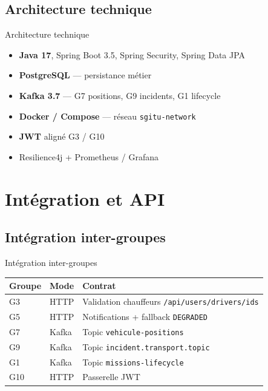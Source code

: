 \documentclass[aspectratio=169,xcolor=table]{beamer}
\begin{document}
\subsection{Architecture technique}

\begin{frame}{Architecture technique}
  \begin{itemize}
    \item \textbf{Java 17}, Spring Boot 3.5, Spring Security, Spring Data JPA
    \item \textbf{PostgreSQL} — persistance métier
    \item \textbf{Kafka 3.7} — G7 positions, G9 incidents, G1 lifecycle
    \item \textbf{Docker / Compose} — réseau \texttt{sgitu-network}
    \item \textbf{JWT} aligné G3 / G10
    \item Resilience4j + Prometheus / Grafana
  \end{itemize}
\end{frame}

\section{Intégration et API}

\subsection{Intégration inter-groupes}

\begin{frame}{Intégration inter-groupes}
  \small
  \begin{table}[]
    \centering
    \renewcommand{\arraystretch}{1.3}
    \setlength{\tabcolsep}{8pt}
    {
      \begin{tabular}{p{1.5cm}p{1.5cm}p{5.2cm}}
        \toprule
        \textbf{Groupe} & \textbf{Mode} & \textbf{Contrat} \\
        \midrule
        G3 & HTTP & Validation chauffeurs \texttt{/api/users/drivers/ids} \\
        G5 & HTTP & Notifications + fallback \texttt{DEGRADED} \\
        G7 & Kafka & Topic \texttt{vehicule-positions} \\
        G9 & Kafka & Topic \texttt{incident.transport.topic} \\
        G1 & Kafka & Topic \texttt{missions-lifecycle} \\
        G10 & HTTP & Passerelle JWT \\
        \bottomrule
      \end{tabular}
    }
  \end{table}
\end{frame}
\end{document}
